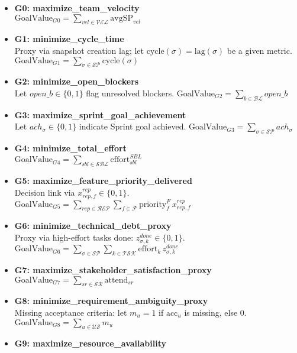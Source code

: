 \documentclass[11pt,a4paper]{article}
\begin{document}
\begin{itemize}[leftmargin=2em]
  \item \textbf{G0: maximize\_team\_velocity} \\
  $\displaystyle \text{GoalValue}_{G0}=\sum_{vel\in\mathcal{VEL}} \text{avgSP}_{vel}$
  \item \textbf{G1: minimize\_cycle\_time} \\
  Proxy via snapshot creation lag; let $\text{cycle}(\sigma)=\text{lag}(\sigma)$ be a given metric. \\
  $\displaystyle \text{GoalValue}_{G1}=\sum_{\sigma\in\mathcal{SP}} \text{cycle}(\sigma)$
  \item \textbf{G2: minimize\_open\_blockers} \\
  Let $open\_b\in\{0,1\}$ flag unresolved blockers. $\displaystyle \text{GoalValue}_{G2}=\sum_{b\in\mathcal{BL}} open\_b$
  \item \textbf{G3: maximize\_sprint\_goal\_achievement} \\
  Let $ach_{\sigma}\in\{0,1\}$ indicate Sprint goal achieved. $\displaystyle \text{GoalValue}_{G3}=\sum_{\sigma\in\mathcal{SP}} ach_{\sigma}$
  \item \textbf{G4: minimize\_total\_effort} \\
  $\displaystyle \text{GoalValue}_{G4}=\sum_{sbl\in\mathcal{SBL}} \text{effort}^{SBL}_{sbl}$
  \item \textbf{G5: maximize\_feature\_priority\_delivered} \\
  Decision link via $x^{rep}_{rep,f}\in\{0,1\}$. $\displaystyle \text{GoalValue}_{G5}=\sum_{rep\in\mathcal{REP}}\sum_{f\in\mathcal{F}} \text{priority}^F_f \, x^{rep}_{rep,f}$
  \item \textbf{G6: minimize\_technical\_debt\_proxy} \\
  Proxy via high-effort tasks done: $z^{done}_{\sigma,k}\in\{0,1\}$. $\displaystyle \text{GoalValue}_{G6}=\sum_{\sigma\in\mathcal{SP}}\sum_{k\in\mathcal{TSK}} \text{effort}_k \, z^{done}_{\sigma,k}$
  \item \textbf{G7: maximize\_stakeholder\_satisfaction\_proxy} \\
  $\displaystyle \text{GoalValue}_{G7}=\sum_{sr\in\mathcal{SR}} \text{attend}_{sr}$
  \item \textbf{G8: minimize\_requirement\_ambiguity\_proxy} \\
  Missing acceptance criteria: let $m_u = 1$ if $\text{acc}_u$ is missing, else $0$. $\displaystyle \text{GoalValue}_{G8}=\sum_{u\in\mathcal{US}} m_u$
  \item \textbf{G9: maximize\_resource\_availability} \\

\end{itemize}
\end{document}
